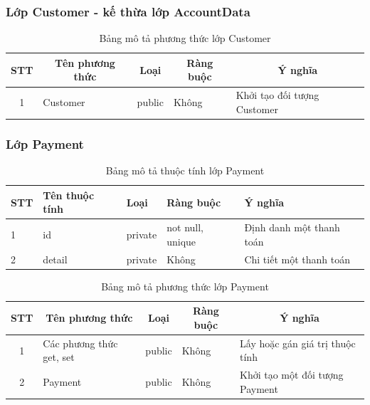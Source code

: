 \documentclass[a4paper, 12pt]{article}
\begin{document}
\subsubsection{Lớp Customer - kế thừa lớp AccountData}

\begin{table}[H]
	\begin{center}
		\begin{tabular}{|c|l|c|l|l|}
			\hline
			STT & \multicolumn{1}{c|}{Tên phương thức} & Loại   & \multicolumn{1}{c|}{Ràng buộc} & \multicolumn{1}{c|}{Ý nghĩa} \\ \hline
			1   & Customer                             & public &         Không                       & Khởi tạo đối tượng Customer  \\ \hline
			\end{tabular}
		\caption{Bảng mô tả phương thức lớp Customer}
	\end{center}
\end{table}

\subsubsection{Lớp Payment}

\begin{table}[H]
	\begin{center}
		\begin{tabular}{|l|l|l|l|l|}
		\hline
		STT & Tên thuộc tính & Loại    & Ràng buộc & Ý nghĩa                  \\ \hline
		1   & id             & private &   not null, unique        & Định danh một thanh toán \\ \hline
		2   & detail         & private &   Không        & Chi tiết một thanh toán  \\ \hline
		\end{tabular}
		\caption{Bảng mô tả thuộc tính lớp Payment}
	\end{center}
\end{table}

\begin{table}[H]
	\begin{center}
		\begin{tabular}{|c|l|c|l|l|}
			\hline
			STT & \multicolumn{1}{c|}{Tên phương thức} & Loại                        & \multicolumn{1}{c|}{Ràng buộc} & \multicolumn{1}{c|}{Ý nghĩa}    \\ \hline
			1   & Các phương thức get, set             & public                      &      Không                          & Lấy hoặc gán giá trị thuộc tính \\ \hline
			2   & Payment                              & \multicolumn{1}{l|}{public} &      Không                          & Khởi tạo một đối tượng Payment  \\ \hline
			\end{tabular}
		\caption{Bảng mô tả phương thức lớp Payment}
	\end{center}
\end{table}
\end{document}
